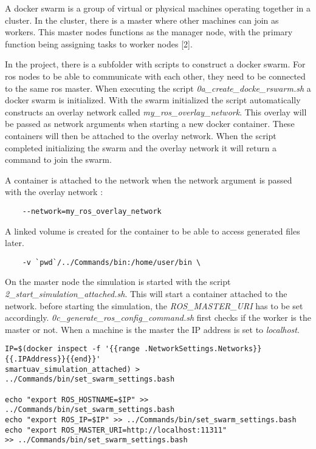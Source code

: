 A docker swarm is a group of virtual or physical machines operating together in a cluster.
In the cluster, there is a master where other machines can join as workers. This master
nodes functions as the manager node, with the primary function being assigning tasks to
worker nodes [2].

In the project, there is a subfolder with scripts to construct a docker swarm. For \acs{ros} nodes
to be able to communicate with each other, they need to be connected to the same \acs{ros}
master. When executing the script \textit{0a\_create\_docke\_rswarm.sh} a docker swarm is initialized.
With the swarm initialized the script automatically constructs an overlay network called
\textit{my\_ros\_overlay\_network}. This overlay will be passed as network arguments when starting
a new docker container. These containers will then be attached to the overlay network.
When the script completed initializing the swarm and the overlay network it will return a
command to join the swarm.

A container is attached to the network when the network argument is passed with the
overlay network :

\begin{verbatim}
    --network=my_ros_overlay_network
\end{verbatim}

A linked volume is created for the container to be able to access generated files later.

\begin{verbatim}
    -v `pwd`/../Commands/bin:/home/user/bin \
\end{verbatim}

On the master node the simulation is started with the script \textit{2\_start\_simulation\_attached.sh}. This will 
start a container attached to the network. before starting the simulation, the \textit{ROS\_MASTER\_URI} has to be 
set accordingly. \textit{0c\_generate\_ros\_config\_command.sh} first checks if the worker is the master or not. When 
a machine is the master the IP address is set to \textit{localhost}.

\begin{verbatim}
IP=$(docker inspect -f '{{range .NetworkSettings.Networks}}{{.IPAddress}}{{end}}' 
smartuav_simulation_attached) > ../Commands/bin/set_swarm_settings.bash

echo "export ROS_HOSTNAME=$IP" >> ../Commands/bin/set_swarm_settings.bash 
echo "export ROS_IP=$IP" >> ../Commands/bin/set_swarm_settings.bash
echo "export ROS_MASTER_URI=http://localhost:11311" 
>> ../Commands/bin/set_swarm_settings.bash
\end{verbatim}

